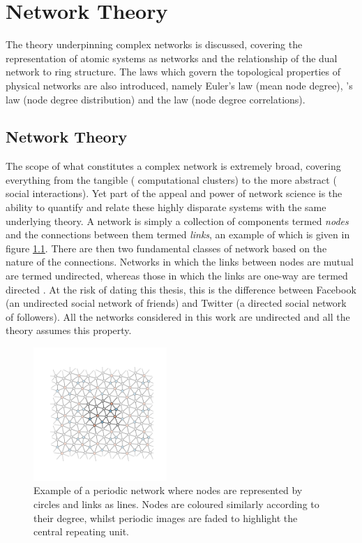\chapter{Network Theory}
\label{ch:networktheory}

\begin{chapterabstract}
The theory underpinning complex networks is discussed, covering the representation of atomic systems as networks and the relationship of the dual network to ring structure.
The laws which govern the topological properties of physical networks are also introduced, namely Euler's law (mean node degree), \lm's law (node degree distribution) and the \aw{} law (node degree correlations).
\end{chapterabstract}

\section{Network Theory}
\label{sec:networktheory}

The scope of what constitutes a complex network is extremely broad, covering everything from the tangible (\eg{} computational clusters) to the more abstract (\eg{} social interactions). Yet part of the appeal and power of network science is the ability to quantify and relate these highly disparate systems with the same underlying theory.
A network is simply a collection of components termed \textit{nodes} and the connections between them termed \textit{links}, an example of which is given in figure \ref{fig:smallnet}.
There are then two fundamental classes of network based on the nature of the connections.
Networks in which the links between nodes are mutual are termed undirected, whereas those in which the links are one\--way are termed directed \cite{barabasi2016n}.
At the risk of dating this thesis, this is the difference between Facebook (an undirected social network of friends) and Twitter (a directed social network of followers).
All the networks considered in this work are undirected and all the theory assumes this property.

\begin{figure}[ht]
     \centering
      \includegraphics[width=0.45\textwidth]{./figures/methods/small_periodic_net.pdf}
     \caption{Example of a periodic \td{} network where nodes are represented by circles and links as lines. Nodes are coloured similarly according to their degree, whilst periodic images are faded to highlight the central repeating unit.}
     \label{fig:smallnet}
\end{figure}

